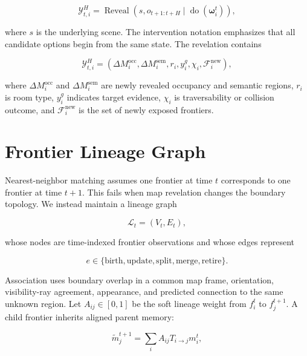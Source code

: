 \documentclass[10pt,twocolumn]{article}
\newcommand{\Frontiers}{\mathcal{F}}
\newcommand{\Reveal}{\mathcal{Y}}
\newcommand{\Option}{\boldsymbol{\omega}}
\begin{document}
\begin{equation}
\Reveal_{t,i}^{H}
=
\operatorname{Reveal}
\left(
s,o_{t+1:t+H}
\mid
\operatorname{do}(\Option_i^t)
\right),
\label{eq:revelation}
\end{equation}

where \(s\) is the underlying scene. The intervention notation emphasizes that
all candidate options begin from the same state. The revelation contains

\begin{equation}
\Reveal_{t,i}^{H}
=
\left(
\Delta M_i^{\mathrm{occ}},
\Delta M_i^{\mathrm{sem}},
r_i,
y_i^g,
\chi_i,
\Frontiers_i^{\mathrm{new}}
\right),
\end{equation}

where \(\Delta M_i^{\mathrm{occ}}\) and
\(\Delta M_i^{\mathrm{sem}}\) are newly revealed occupancy and semantic
regions, \(r_i\) is room type, \(y_i^g\) indicates target evidence,
\(\chi_i\) is traversability or collision outcome, and
\(\Frontiers_i^{\mathrm{new}}\) is the set of newly exposed frontiers.

\section{Frontier Lineage Graph}

Nearest-neighbor matching assumes one frontier at time \(t\) corresponds to
one frontier at time \(t+1\). This fails when map revelation changes the
boundary topology. We instead maintain a lineage graph

\begin{equation}
\mathcal{L}_t=(V_t,E_t),
\end{equation}

whose nodes are time-indexed frontier observations and whose edges represent

\begin{equation}
e\in
\{
\mathrm{birth},
\mathrm{update},
\mathrm{split},
\mathrm{merge},
\mathrm{retire}
\}.
\end{equation}

Association uses boundary overlap in a common map frame, orientation,
visibility-ray agreement, appearance, and predicted connection to the same
unknown region. Let \(A_{ij}\in[0,1]\) be the soft lineage weight from
\(f_i^t\) to \(f_j^{t+1}\). A child frontier inherits aligned parent memory:

\begin{equation}
\widetilde m_j^{t+1}
=
\sum_{i}
A_{ij}
T_{i\rightarrow j}m_i^t,
\label{eq:inherit}
\end{equation}
\end{document}
